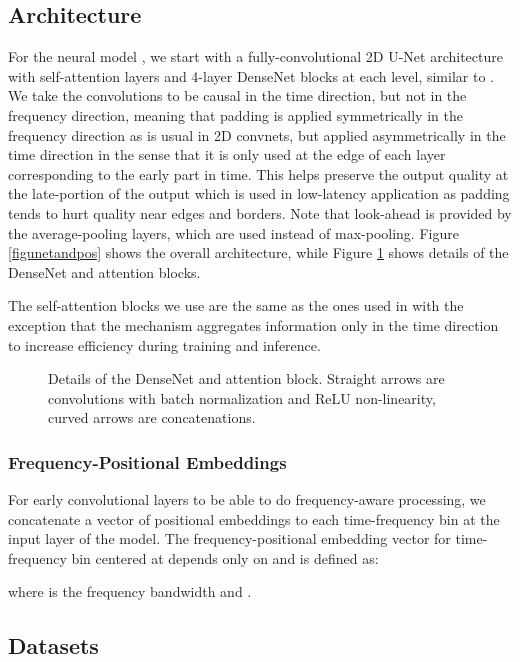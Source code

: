 \documentclass[english]{article}
\begin{document}
\subsection{Architecture} For the neural model , we start with a fully-convolutional 2D U-Net architecture with self-attention layers and 4-layer DenseNet blocks at each level, similar to \cite{tolooshams19}. We take the convolutions to be causal in the time direction, but not in the frequency direction, meaning that padding is applied symmetrically in the frequency direction as is usual in 2D convnets, but applied asymmetrically in the time direction in the sense that it is only used at the edge of each layer corresponding to the early part in time. This helps preserve the output quality at the late-portion of the output which is used in low-latency application as padding tends to hurt quality near edges and borders. Note that look-ahead is provided by the average-pooling layers, which are used instead of max-pooling. Figure \ref{figunetandpos} shows the overall architecture, while Figure \ref{figdenseattention} shows details of the DenseNet and attention blocks. 

The self-attention blocks we use are the same as the ones used in \cite{wang2018non, zhang2018self} with the exception that the mechanism aggregates information only in the time direction to increase efficiency during training and inference. 

\begin{figure}
    \caption{Details of the DenseNet and attention block. Straight arrows are convolutions with batch normalization and ReLU non-linearity, curved arrows are concatenations. }
\label{figdenseattention}
\vspace{-0.15in}
\end{figure}

\subsubsection{Frequency-Positional Embeddings} For early convolutional layers to be able to do frequency-aware processing, we concatenate a vector of positional embeddings to each time-frequency bin at the input layer of the model. The frequency-positional embedding vector for time-frequency bin centered at  depends only on  and is defined as:

where  is the frequency bandwidth and . 


\subsection{Datasets}
\end{document}
